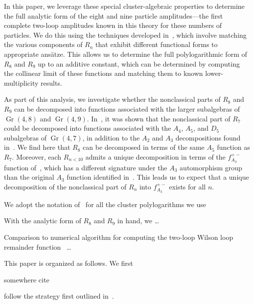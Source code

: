 \documentclass[11pt]{article}
\DeclareMathOperator{\Gr}{Gr}
\begin{document}
In this paper, we leverage these special cluster-algebraic properties to determine the full analytic form of the eight and nine particle amplitudes---the first complete two-loop amplitudes known in this theory for these numbers of particles. We do this using the techniques developed in~\cite{Golden:2014xqa,Golden:2014xqf,Golden:2018gtk,Golden:2019kks}, which involve matching the various components of $R_n$ that exhibit different functional forms to appropriate ans\"atze. This allows us to determine the full polylogarithmic form of $R_8$ and $R_9$ up to an additive constant, which can be determined by computing the collinear limit of these functions and matching them to known lower-multiplicity results. 

As part of this analysis, we investigate whether the nonclassical parts of $R_8$ and $R_9$ can be decomposed into functions associated with the larger subalgebras of $\Gr(4,8)$ and $\Gr(4,9)$. In~\cite{Golden:2018gtk}, it was shown that the nonclassical part of $R_7$ could be decomposed into functions associated with the $A_4$, $A_5$, and $D_5$ subalgebras of $\Gr(4,7)$, in addition to the $A_2$ and $A_3$ decompositions found in~\cite{Golden:2014xqa}. We find here that $R_8$ can be decomposed in terms of the same $A_5$ function as $R_7$. Moreover, each $R_{n<10}$ admits a unique decomposition in terms of the $f_{A_3}^{+-}$ function of~\cite{Golden:2014xqa}, which has a different signature under the $A_3$ automorphism group than the original $A_3$ function identified in~\cite{Golden:2014xqa}. This leads us to expect that a unique decomposition of the nonclassical part of $R_n$ into $f_{A_3}^{+-}$ exists for all $n$.


We adopt the notation of~\cite{Golden:2018gtk} for all the cluster polylogarithms we use

With the analytic form of $R_8$ and $R_9$ in hand, we \dots

Comparison to numerical algorithm for computing the two-loop Wilson loop remainder function~\cite{Anastasiou:2009kna,Brandhuber:2009da} \dots
  
 
This paper is organized as follows. We first 
 
 somewhere cite ~\cite{1021.16017}
 
 follow the strategy first outlined in~\cite{Golden:2014xqf}.
 
\end{document}
